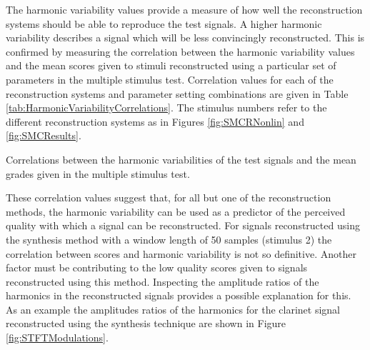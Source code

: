 		The harmonic variability values provide a measure of how well the reconstruction systems should be able to
		reproduce the test signals. A higher harmonic variability describes a signal which will be less
		convincingly reconstructed. This is confirmed by measuring the correlation between the harmonic variability
		values and the mean scores given to stimuli reconstructed using a particular set of parameters in the
		multiple stimulus test. Correlation values for each of the reconstruction systems and parameter setting
		combinations are given in Table \ref{tab:HarmonicVariabilityCorrelations}. The stimulus numbers refer to
		the different reconstruction systems as in Figures \ref{fig:SMCRNonlin} and \ref{fig:SMCResults}.

		\begin{table}[h!]
			\centering
			
			\caption{Correlations between the harmonic variabilities of the test signals and 
				 the mean grades given in the multiple stimulus test.}
			\label{tab:HarmonicVariabilityCorrelations}
		\end{table}

		These correlation values suggest that, for all but one of the reconstruction methods, the harmonic
		variability can be used as a predictor of the perceived quality with which a signal can be reconstructed.
		For signals reconstructed using the synthesis method with a window length of 50 samples (stimulus 2) the
		correlation between scores and harmonic variability is not so definitive. Another factor must be
		contributing to the low quality scores given to signals reconstructed using this method. Inspecting the
		amplitude ratios of the harmonics in the reconstructed signals provides a possible explanation for this.
		As an example the amplitudes ratios of the harmonics for the clarinet signal reconstructed using the
		synthesis technique are shown in Figure \ref{fig:STFTModulations}.

